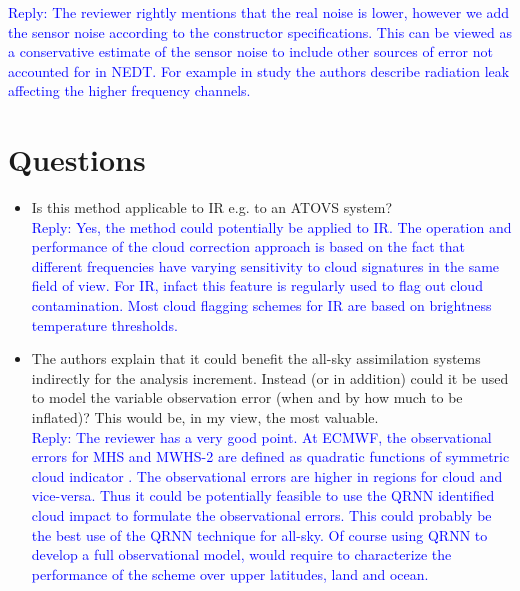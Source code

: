 \documentclass[11pt,a4paper,draft]{article}
\begin{document}
\begin{itemize}
\textcolor{blue}{Reply: The reviewer rightly mentions that the real noise is lower, however we add the sensor noise according to the constructor specifications. This can be viewed as a conservative estimate of the sensor noise to include other sources of error not accounted for in NEDT. For example in study \citet{Carminati-fy3d-2020} the authors describe radiation leak affecting the higher frequency channels.}

\end{itemize}

		
		
\section*{Questions}
\begin{itemize}
		
\item	
		Is this method applicable to IR e.g. to an ATOVS system?\\
	
\textcolor{blue}{Reply:  Yes, the method could potentially be applied to IR. The operation and  performance of the cloud correction approach is based on the fact that different frequencies have varying sensitivity to cloud signatures in the same field of view. For IR, infact this feature is regularly used to flag out cloud contamination. Most cloud flagging schemes for IR are based on brightness temperature thresholds.
}\\

\item 		
		The authors explain that it could benefit the all-sky assimilation systems indirectly for
		the analysis increment. Instead (or in addition) could it be used to model the variable
		observation error (when and by how much to be inflated)? This would be, in my view,
		the most valuable.	\\
			
\textcolor{blue}{Reply: The reviewer has a very good point. At ECMWF, the observational errors for MHS and MWHS-2 are defined as quadratic functions of symmetric cloud indicator \citep{geer2015scatteringindex}. The observational errors are higher in regions for cloud and vice-versa. Thus it could be potentially feasible to use the QRNN identified cloud impact to formulate the observational errors.  This could probably be the best use of the QRNN technique for all-sky. Of course using QRNN to develop a full observational model, would require to characterize the performance of the scheme over upper latitudes, land and ocean.}\\
		

\end{itemize}
\end{document}
